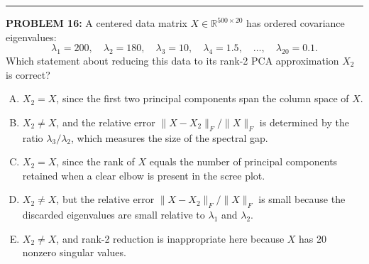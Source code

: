 \documentclass[12pt]{amsart}
\newcommand{\divider}{
  \vspace{-1em} %
  \noindent
  \raisebox{-0.15ex}{\textbullet}%
  \hspace{0.5em}%
  \rule[0.5ex]{0.95\textwidth}{1.0pt}%
  \hspace{0.5em}%
  \raisebox{-0.15ex}{\textbullet}%
  \vspace{0em} %
}
\begin{document}
\divider





{\bf PROBLEM 16:}
%
A centered data matrix $X \in \mathbb{R}^{500 \times 20}$ has ordered covariance eigenvalues:
$$\lambda_1 = 200, \quad \lambda_2 = 180, \quad \lambda_3 = 10, \quad \lambda_4 = 1.5, 
\quad \ldots, \quad \lambda_{20} = 0.1.$$
%
Which statement about reducing this data to its rank-2 PCA approximation $X_2$ is correct?

\begin{enumerate}[(A)]
\item $X_2 = X$, since the first two principal components span the column space of $X$.
\item $X_2 \neq X$, and the relative error $\|X - X_2\|_F / \|X\|_F$ is determined by the 
ratio $\lambda_3 / \lambda_2$, which measures the size of the spectral gap.
\item $X_2 = X$, since the rank of $X$ equals the number of principal components retained 
when a clear elbow is present in the scree plot.
\item $X_2 \neq X$, but the relative error $\|X - X_2\|_F / \|X\|_F$ is small because the 
discarded eigenvalues are small relative to $\lambda_1$ and $\lambda_2$.
\item $X_2 \neq X$, and rank-2 reduction is inappropriate here because $X$ has 20 nonzero 
singular values.
\end{enumerate}
\end{document}
